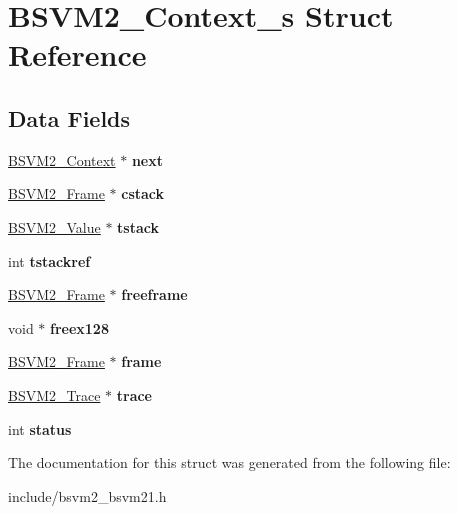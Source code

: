 \hypertarget{structBSVM2__Context__s}{\section{B\-S\-V\-M2\-\_\-\-Context\-\_\-s Struct Reference}
\label{structBSVM2__Context__s}
}
\subsection*{Data Fields}
\begin{DoxyCompactItemize}
\item 
\hypertarget{structBSVM2__Context__s_ad4c69583a306be456619738d670d4120}{\hyperlink{structBSVM2__Context__s}{B\-S\-V\-M2\-\_\-\-Context} $\ast$ {\bfseries next}}\label{structBSVM2__Context__s_ad4c69583a306be456619738d670d4120}

\item 
\hypertarget{structBSVM2__Context__s_a0263310d79e0e6559b535c8c4a402ee5}{\hyperlink{structBSVM2__Frame__s}{B\-S\-V\-M2\-\_\-\-Frame} $\ast$ {\bfseries cstack}}\label{structBSVM2__Context__s_a0263310d79e0e6559b535c8c4a402ee5}

\item 
\hypertarget{structBSVM2__Context__s_abc1ac342545a590f547c35ce3175f849}{\hyperlink{unionBSVM2__Value__u}{B\-S\-V\-M2\-\_\-\-Value} $\ast$ {\bfseries tstack}}\label{structBSVM2__Context__s_abc1ac342545a590f547c35ce3175f849}

\item 
\hypertarget{structBSVM2__Context__s_ad25b3956beb4f1dba08191780c09925e}{int {\bfseries tstackref}}\label{structBSVM2__Context__s_ad25b3956beb4f1dba08191780c09925e}

\item 
\hypertarget{structBSVM2__Context__s_a4aec8850ab4f384281aae4b59e902de9}{\hyperlink{structBSVM2__Frame__s}{B\-S\-V\-M2\-\_\-\-Frame} $\ast$ {\bfseries freeframe}}\label{structBSVM2__Context__s_a4aec8850ab4f384281aae4b59e902de9}

\item 
\hypertarget{structBSVM2__Context__s_ad58fb51a06541d63499baf5732133b63}{void $\ast$ {\bfseries freex128}}\label{structBSVM2__Context__s_ad58fb51a06541d63499baf5732133b63}

\item 
\hypertarget{structBSVM2__Context__s_a56387eb1e143cdd34e5ba026143d661d}{\hyperlink{structBSVM2__Frame__s}{B\-S\-V\-M2\-\_\-\-Frame} $\ast$ {\bfseries frame}}\label{structBSVM2__Context__s_a56387eb1e143cdd34e5ba026143d661d}

\item 
\hypertarget{structBSVM2__Context__s_a672108a4bab4c8c31ba068d1aa2f6d96}{\hyperlink{structBSVM2__Trace__s}{B\-S\-V\-M2\-\_\-\-Trace} $\ast$ {\bfseries trace}}\label{structBSVM2__Context__s_a672108a4bab4c8c31ba068d1aa2f6d96}

\item 
\hypertarget{structBSVM2__Context__s_a5a1f6a8592d64bbd9ecaa090df53a30c}{int {\bfseries status}}\label{structBSVM2__Context__s_a5a1f6a8592d64bbd9ecaa090df53a30c}

\end{DoxyCompactItemize}


The documentation for this struct was generated from the following file\-:\begin{DoxyCompactItemize}
\item 
include/bsvm2\-\_\-bsvm21.\-h\end{DoxyCompactItemize}
